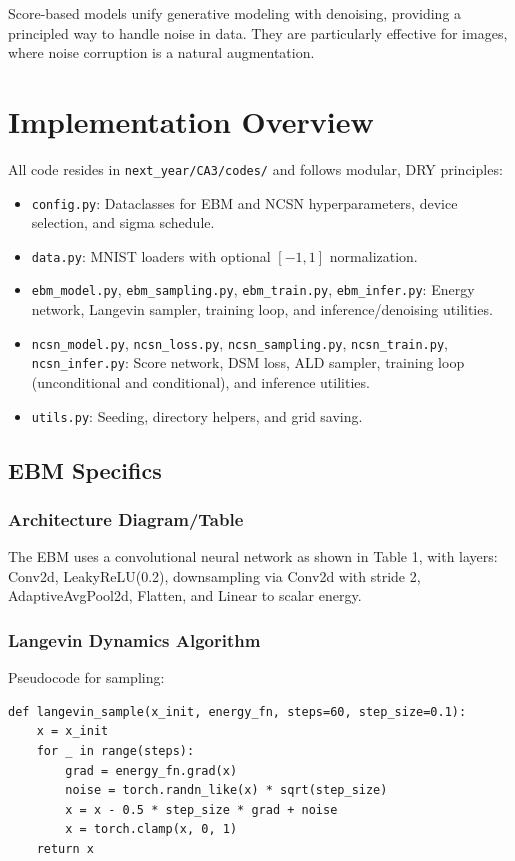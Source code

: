 \documentclass[a4paper,12pt]{article}
\begin{document}
Score-based models unify generative modeling with denoising, providing a principled way to handle noise in data. They are particularly effective for images, where noise corruption is a natural augmentation.

\section{Implementation Overview}
All code resides in \texttt{next\_year/CA3/codes/} and follows modular, DRY principles:
\begin{itemize}[leftmargin=*]
    \item \texttt{config.py}: Dataclasses for EBM and NCSN hyperparameters, device selection, and sigma schedule.
    \item \texttt{data.py}: MNIST loaders with optional $[-1,1]$ normalization.
    \item \texttt{ebm\_model.py}, \texttt{ebm\_sampling.py}, \texttt{ebm\_train.py}, \texttt{ebm\_infer.py}: Energy network, Langevin sampler, training loop, and inference/denoising utilities.
    \item \texttt{ncsn\_model.py}, \texttt{ncsn\_loss.py}, \texttt{ncsn\_sampling.py}, \texttt{ncsn\_train.py}, \texttt{ncsn\_infer.py}: Score network, DSM loss, ALD sampler, training loop (unconditional and conditional), and inference utilities.
    \item \texttt{utils.py}: Seeding, directory helpers, and grid saving.
\end{itemize}

\subsection{EBM Specifics}
\subsubsection{Architecture Diagram/Table}
The EBM uses a convolutional neural network as shown in Table 1, with layers: Conv2d, LeakyReLU(0.2), downsampling via Conv2d with stride 2, AdaptiveAvgPool2d, Flatten, and Linear to scalar energy.

\subsubsection{Langevin Dynamics Algorithm}
Pseudocode for sampling:
\begin{verbatim}
def langevin_sample(x_init, energy_fn, steps=60, step_size=0.1):
    x = x_init
    for _ in range(steps):
        grad = energy_fn.grad(x)
        noise = torch.randn_like(x) * sqrt(step_size)
        x = x - 0.5 * step_size * grad + noise
        x = torch.clamp(x, 0, 1)
    return x
\end{verbatim}
\end{document}
